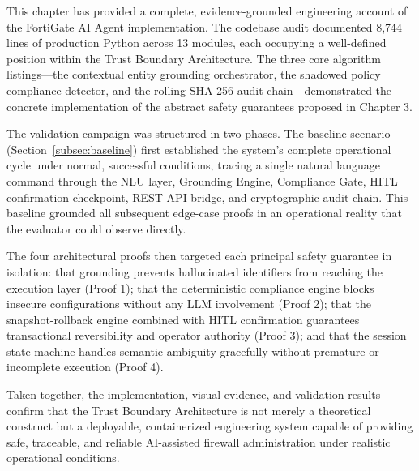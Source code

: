 This chapter has provided a complete, evidence-grounded engineering account of the FortiGate AI Agent implementation. The codebase audit documented 8,744 lines of production Python across 13 modules, each occupying a well-defined position within the Trust Boundary Architecture. The three core algorithm listings—the contextual entity grounding orchestrator, the shadowed policy compliance detector, and the rolling SHA-256 audit chain—demonstrated the concrete implementation of the abstract safety guarantees proposed in Chapter 3.

The validation campaign was structured in two phases. The baseline scenario (Section~\ref{subsec:baseline}) first established the system's complete operational cycle under normal, successful conditions, tracing a single natural language command through the NLU layer, Grounding Engine, Compliance Gate, HITL confirmation checkpoint, REST API bridge, and cryptographic audit chain. This baseline grounded all subsequent edge-case proofs in an operational reality that the evaluator could observe directly.

The four architectural proofs then targeted each principal safety guarantee in isolation: that grounding prevents hallucinated identifiers from reaching the execution layer (Proof 1); that the deterministic compliance engine blocks insecure configurations without any LLM involvement (Proof 2); that the snapshot-rollback engine combined with HITL confirmation guarantees transactional reversibility and operator authority (Proof 3); and that the session state machine handles semantic ambiguity gracefully without premature or incomplete execution (Proof 4).

Taken together, the implementation, visual evidence, and validation results confirm that the Trust Boundary Architecture is not merely a theoretical construct but a deployable, containerized engineering system capable of providing safe, traceable, and reliable AI-assisted firewall administration under realistic operational conditions.

